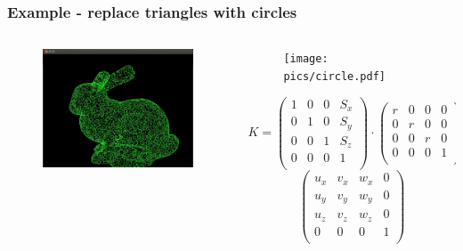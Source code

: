 \begin{frame}[fragile]
    \frametitle{Example - replace triangles with circles}
  \begin{columns}[T]
    \begin{column}{.44\textwidth}
	    \begin{figure}[h]
    		\includegraphics[width=5cm,keepaspectratio]{pics/ts_circle}
    	\end{figure}
    \end{column}
    \begin{column}{.48\textwidth}
 	    \begin{figure}[h]
    		\texttt{[image: pics/circle.pdf]}
    	\end{figure}
{\tiny
$$
K=
\left( 
\begin{array}{cccc} 
1 & 0 & 0 & S_x \\
0 & 1 & 0 & S_y \\
0 & 0 & 1 & S_z \\
0 & 0 & 0 & 1  \\
\end{array}
\right)
\cdot
\left( 
\begin{array}{cccc} 
r & 0 & 0 & 0 \\
0 & r & 0 & 0 \\
0 & 0 & r & 0 \\
0 & 0 & 0 & 1  \\
\end{array}
\right)
\cdot$$
$$
\left( 
\begin{array}{cccc} 
u_x & v_x & w_x & 0 \\
u_y & v_y & w_y & 0 \\
u_z & v_z & w_z & 0 \\
0 & 0 & 0 & 1  \\
\end{array}
\right)
$$
}
    \end{column}
  \end{columns}
\end{frame}

